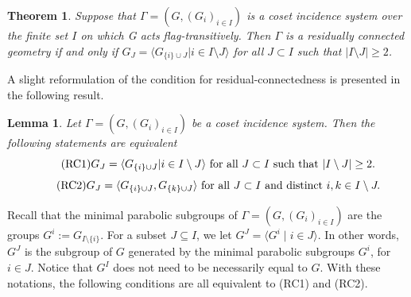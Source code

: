 \documentclass[11pt,letterpaper]{amsart}
\newtheorem{thm}[prop]{Theorem}
\newtheorem{lemma}[prop]{Lemma}
\begin{document}
\begin{thm}\cite[Corollary 1.8.13]{buekenhout2013diagram} \label{thm:CosetRC}
    Suppose that $\Gamma = (G,(G_i)_{i\in I})$ is a coset incidence system over
the finite set $I$ on which G acts flag-transitively. Then $\Gamma$ is a residually connected geometry if and only if $G_J = \langle G_{\{i\} \cup J} | i \in I \setminus J \rangle$ for all $J \subset I$ such that $|I \setminus J| \geq 2$.
\end{thm}

A slight reformulation of the condition for residual-connectedness is presented in the following result.

\begin{lemma}\cite[Proposition 1.8.12]{buekenhout2013diagram} \label{prop:RCcondi}
    Let $\Gamma = (G,(G_i)_{i\in I})$ be a coset incidence system. Then the following statements are equivalent
    \begin{equation}\tag{RC1}
        G_J = \langle G_{\{i\} \cup J} | i \in I \setminus J \rangle \textnormal{ for all }J \subset I \textnormal{ such that }|I \setminus J| \geq 2.
    \end{equation}
    \begin{equation}\tag{RC2}
        G_J = \langle G_{\{i\} \cup J} , G_{\{k\} \cup J} \rangle \textnormal{ for all }J \subset I \textnormal{ and distinct }i,k\in I\setminus J.
    \end{equation}
\end{lemma}

Recall that the minimal parabolic subgroups of $\Gamma = (G,(G_i)_{i\in I})$ are the groups $G^i :=G_{I\setminus\{i\}}$. For a subset $J\subseteq I$, we let $G^J=\langle G^i\mid i\in J\rangle$. In other words, $G^J$ is the subgroup of $G$ generated by the minimal parabolic subgroups $G^i$, for $i\in J$. Notice that $G^I$ does not need to be necessarily equal to $G$. With these notations, the following conditions are all equivalent to (RC1) and (RC2).
\end{document}
